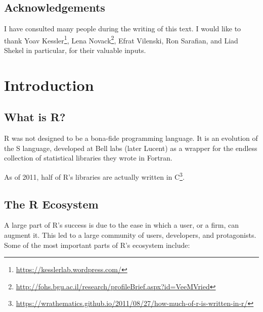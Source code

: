 \documentclass[]{book}
\renewcommand{\href}[2]{#2\footnote{\url{#1}}}
\theoremstyle{definition}
\theoremstyle{definition}
\theoremstyle{definition}
\theoremstyle{remark}
\begin{document}
\hypertarget{acknowledgements}{%
\section{Acknowledgements}\label{acknowledgements}}

I have consulted many people during the writing of this text.
I would like to thank \href{https://kesslerlab.wordpress.com/}{Yoav Kessler}, \href{http://fohs.bgu.ac.il/research/profileBrief.aspx?id=VeeMVried}{Lena Novack}, Efrat Vilenski, Ron Sarafian, and Liad Shekel in particular, for their valuable inputs.

\hypertarget{intro}{%
\chapter{Introduction}\label{intro}}

\hypertarget{what-r}{%
\section{What is R?}\label{what-r}}

R was not designed to be a bona-fide programming language.
It is an evolution of the S language, developed at Bell labs (later Lucent) as a wrapper for the endless collection of statistical libraries they wrote in Fortran.

As of 2011, half of R's libraries are \href{https://wrathematics.github.io/2011/08/27/how-much-of-r-is-written-in-r/}{actually written in C}.

\hypertarget{ecosystem}{%
\section{The R Ecosystem}\label{ecosystem}}

A large part of R's success is due to the ease in which a user, or a firm, can augment it.
This led to a large community of users, developers, and protagonists.
Some of the most important parts of R's ecosystem include:
\end{document}
